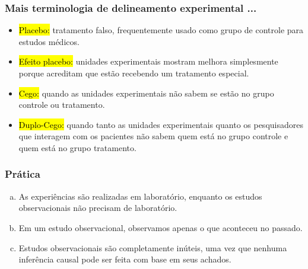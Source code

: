 \begin{frame}
\frametitle{Mais terminologia de delineamento experimental ...}

\begin{itemize}
\justifying
\item \hl{Placebo:} tratamento falso, frequentemente usado como grupo de controle para estudos médicos.
\justifying
\item \hl{Efeito placebo:} unidades experimentais mostram melhora simplesmente porque acreditam que estão recebendo um tratamento especial.
\justifying
\item \hl{Cego:} quando as unidades experimentais não sabem se estão no grupo controle ou tratamento.
\justifying
\item \hl{Duplo-Cego:} quando tanto as unidades experimentais quanto os pesquisadores que interagem com os pacientes não sabem quem está no grupo controle e quem está no grupo tratamento.

\end{itemize}

\end{frame}


\begin{frame}
\frametitle{Prática}
\justifying
{}

\begin{enumerate}[(a)]
\justifying
\item As experiências são realizadas em laboratório, enquanto os estudos observacionais não precisam de laboratório.
\justifying
\item Em um estudo observacional, observamos apenas o que aconteceu no passado.
\justifying
{}
\justifying
\item Estudos observacionais são completamente inúteis, uma vez que nenhuma inferência causal pode ser feita com base em seus achados.
\end{enumerate}

\end{frame}



